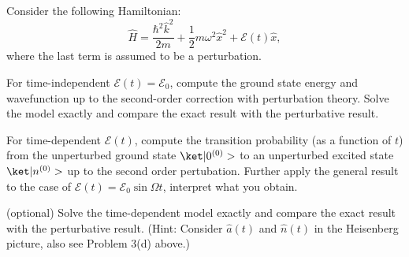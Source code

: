 \begin{problem}
  Consider the following Hamiltonian:
  \[
    \hat H = \frac{\hbar^2\hat k^2}{2m} + \frac12m\omega^2\hat x^2 + \mathcal E(t)\hat x,
  \]
  where the last term is assumed to be a perturbation.
  \begin{enumext}
    \item For time-independent $\mathcal E(t) = \mathcal E_0$,
    compute the ground state energy and wavefunction up to the second-order correction with perturbation theory.
    Solve the model exactly and compare the exact result with the perturbative result.
    \item For time-dependent $\mathcal E(t)$, compute the transition probability
    (as a function of $t$) from the unperturbed ground state $\ket|0^{(0)}>$ to an unperturbed excited state $\ket|n^{(0)}>$ up to the second order pertubation.
    Further apply the general result to the case of $\mathcal E(t) = \mathcal E_0\sin\Omega t$, interpret what you obtain.
    \item* (optional) Solve the time-dependent model exactly and compare the exact result with the perturbative result.
    (Hint: Consider $\hat a(t)$ and $\hat n(t)$ in the Heisenberg picture, also see Problem 3(d) above.)
  \end{enumext}
\end{problem}
